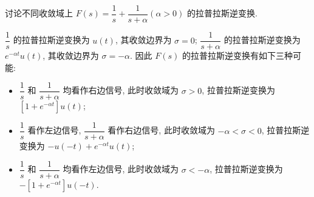 \begin{exampleprob}
    讨论不同收敛域上 $F(s)=\dfrac{1}{s}+\dfrac{1}{s+\alpha} (\alpha>0)$ 的拉普拉斯逆变换.

    \begin{solution}
        $\dfrac{1}{s}$ 的拉普拉斯逆变换为 $u(t)$, 其收敛边界为 $\sigma=0$; $\dfrac{1}{s+\alpha}$ 的拉普拉斯逆变换为 $e^{-\alpha t}u(t)$, 其收敛边界为 $\sigma=-\alpha$. 因此 $F(s)$ 的拉普拉斯逆变换有如下三种可能:
        \begin{itemize}
            \item $\dfrac{1}{s}$ 和 $\dfrac{1}{s+\alpha}$ 均看作右边信号, 此时收敛域为 $\sigma>0$, 拉普拉斯逆变换为 $[1+e^{-\alpha t}]u(t)$;
            \item $\dfrac{1}{s}$ 看作左边信号, $\dfrac{1}{s+\alpha}$ 看作右边信号, 此时收敛域为 $-\alpha<\sigma<0$, 拉普拉斯逆变换为 $-u(-t)+e^{-\alpha t}u(t)$;
            \item $\dfrac{1}{s}$ 和 $\dfrac{1}{s+\alpha}$ 均看作左边信号, 此时收敛域为 $\sigma<-\alpha$, 拉普拉斯逆变换为 $-[1+e^{-\alpha t}]u(-t)$.
        \end{itemize}
    \end{solution}
\end{exampleprob}
